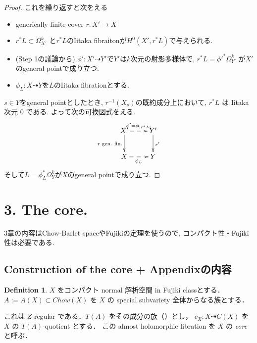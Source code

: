 \documentclass[dvipdfmx,a4paper,11pt]{article} %
\theoremstyle{definition}
\newtheorem{defn}[thm]{Definition}
\theoremstyle{remark}
\numberwithin{equation}{section}
\begin{document}
\begin{proof}
 これを繰り返すと次をえる
 \begin{itemize}
 \item generically finite cover \(r : X' \to X\)
 \item \(r^*L \subset \Omega_{X'}^k\) と\(r^*L\)のIitaka fibraitonが\(H^0(X', r^*L)\)で与えられる.
 \item (Step 1の議論から) \(\phi' : X' \dashrightarrow Y'\)で\(Y'\)は$k$次元の射影多様体で,  \(r^*L=\phi'^*\Omega_{Y'}^k\) が\(X'\)のgeneral pointで成り立つ. 
 \item $\phi_{L} : X \dashrightarrow Y$を$L$のIitaka fibrationとする. 
 \end{itemize}
 $s \in Y$をgeneral pointとしたとき, \(r^{-1}(X_s)\)の既約成分上において, 
 \(r^*L\) は Iitaka次元 \(0\) である. よって次の可換図式をえる. 
\[
\xymatrix{
X' \ar@{-->}[r]^{\phi'=\phi_{|r^*L|}} \ar[d]_{r \text{ gen. fin.}} & Y' \ar[d]^{r'} \\
X \ar@{-->}[r]_{\phi_L} & Y
}
\]
そして\(L = \phi_{L}^{*}\Omega_Y^k\)が\(X\)のgeneral pointで成り立つ. 
\end{proof}


\section{3. The core.}

3章の内容はChow-Barlet spaceやFujikiの定理を使うので, コンパクト性・Fujiki性は必要である. 

\subsection{Construction of the core + Appendixの内容 }
\label{subsec-Cam04-Appendix}

\begin{defn}\cite[Definition 3.1]{Cam04}
\label{defn-Cam04-3.1}
\(X\) をコンパクト normal 解析空間 in Fujiki classとする．
\(A:=A(X)\subset Chow(X)\) を \(X\) の special subvariety 全体からなる族とする．

これは \(Z\)-regular である．\(T(A)\) をその成分の族（\cite[Prop 2.4]{Cam04a}）とし，
\(c_X : X\dashrightarrow C(X)\) を \(X\) の \(T(A)\)-quotient とする．
この almost holomorphic fibration を \(X\) の \emph{core} と呼ぶ．
\end{defn}
\end{document}
